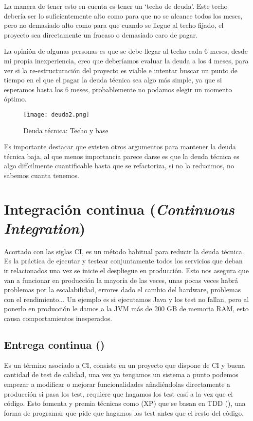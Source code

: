 La manera de tener esto en cuenta es tener un `techo de deuda'. Este techo debería ser lo suficientemente alto como para que no se alcance todos los meses, pero no demasiado alto como para que cuando se llegue al techo fijado, el proyecto sea directamente un fracaso o demasiado caro de pagar.

La opinión de algunas personas es que se debe llegar al techo cada 6 meses, desde mi propia inexperiencia, creo que deberíamos evaluar la deuda a los 4 meses, para ver si la re-estructuración del proyecto es viable e intentar buscar un punto de tiempo en el que el pagar la deuda técnica sea algo más simple, ya que si esperamos hasta los 6 meses, probablemente no podamos elegir un momento óptimo. 

\begin{figure}
	\centering
	\texttt{[image: deuda2.png]}
	\caption{Deuda técnica: Techo y base \cite{kni13}}\label{fig:deuda2.png}
\end{figure}

Es importante destacar que existen otros argumentos para mantener la deuda técnica baja, al que menos importancia parece darse es que la deuda técnica es algo difícilmente cuantificable hasta que se refactoriza, si no la reducimos, no sabemos cuanta tenemos.

\FloatBarrier

\section{Integración continua (\textit{Continuous Integration})}

Acortado con las siglas CI, es un método habitual para reducir la deuda técnica. Es la práctica de ejecutar y testear conjuntamente todos los servicios que deban ir relacionados una vez se inicie el despliegue en producción. Esto nos asegura que van a funcionar en producción la mayoría de las veces, unas pocas veces habrá problemas por la escalabilidad, errores dado el cambio del hardware, problemas con el rendimiento... Un ejemplo es si ejecutamos Java y los test no fallan, pero al ponerlo en producción le damos a la JVM más de 200 GB de memoria RAM, esto causa comportamientos inesperados.

\subsection{Entrega continua ()}

Es un término asociado a CI, consiste en un proyecto que dispone de CI y buena cantidad de test de calidad, una vez ya tengamos un sistema a punto podemos empezar a modificar o mejorar funcionalidades añadiéndolas directamente a producción si pasa los test, requiere que hagamos los test casi a la vez que el código. Esto fomenta y premia técnicas como  (XP) que se basan en TDD (), una forma de programar que pide que hagamos los test antes que el resto del código.


